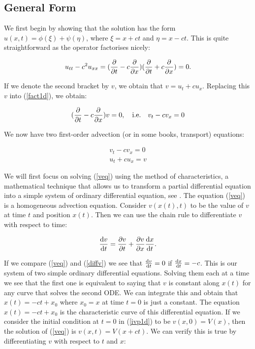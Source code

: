 \documentclass[a4paper, 12pt]{article}
\numberwithin{equation}{section}
\begin{document}
\subsection{General Form}

We first begin by showing that the solution has the form $u(x,
t)=\phi(\xi)+\psi(\eta)$, where $\xi=x+ct$ and $\eta=x-ct$. This is quite
straightforward as the operator factorises nicely:

\begin{equation} \label{fact1d}
    u_{tt}-c^2u_{xx}=(\diffp[1]{}{t} - c \diffp[1]{}{x})(\diffp[1]{}{t} + c \diffp[1]{}{x})=0.
\end{equation}

If we denote the second bracket by $v$, we obtain that $v=u_t+cu_x$. Replacing
this $v$ into (\ref{fact1d}), we obtain:

\begin{equation*} 
    (\diffp[1]{}{t} -c \diffp[1]{}{x})v=0, \quad \textrm{i.e.} \quad v_t-cv_x=0
\end{equation*}

We now have two first-order advection (or in some books, transport) equations:

\begin{align}
    v_t-cv_x=0 \label{veq}\\
    u_t+cu_x=v \label{ueq}
\end{align}

We will first focus on solving (\ref{veq}) using the method of characteristics,
a mathematical technique that allows us to transform a partial differential
equation into a simple system of ordinary differential equation, see \cite{Ev}.
The equation (\ref{veq}) is a homogeneous advection equation. Consider
$v(x(t),t)$ to be the value of $v$ at time $t$ and position $x(t)$. Then we can
use the chain rule to differentiate $v$ with respect to time:

\begin{equation} \label{diffv}
    \diff{v}{t}=\diffp[1]{v}{t}+\diffp[1]{v}{x}\diff{x}{t}.
\end{equation}

If we compare (\ref{veq}) and (\ref{diffv}) we see that $\diff{v}{t}=0$ if
$\diff{x}{t}=-c$. This is our system of two simple ordinary differential
equations. Solving them each at a time we see that the first one is equivalent
to saying that $v$ is constant along $x(t)$ for any curve that solves the second
ODE. We can integrate this and obtain that $x(t)=-ct+x_0$ where $x_0=x$ at time
$t=0$ is just a constant. The equation $x(t)=-ct+x_0$ is the characteristic
curve of this differential equation. If we consider the initial condition at
$t=0$ in (\ref{ivp1d}) to be $v(x,0)=V(x)$, then the solution of (\ref{veq}) is
$v(x,t)=V(x+ct)$. We can verify this is true by differentiating $v$ with respect
to $t$ and $x$:
\end{document}
